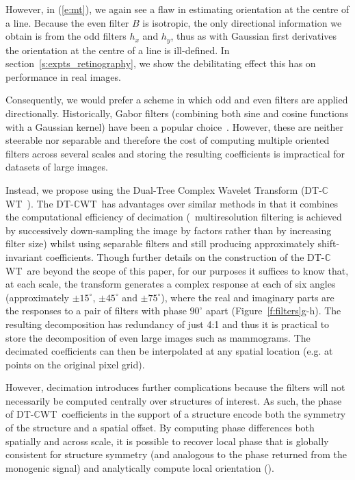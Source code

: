\documentclass[10pt,twocolumn,letterpaper]{article}
\newcommand{\fref}[1]{Figure~\ref{#1}}
\newcommand{\eref}[1]{(\ref{#1})}
\def\dtcwt{DT-$\mathbb{C}$WT}
\newcommand{\comment}[1]{}
\begin{document}
However, in \eref{e:mt}, we again see a flaw in estimating orientation at the centre of a line. Because the even filter $B$ is isotropic, the only directional information we obtain is from the odd filters $h_x$ and $h_y$, thus as with Gaussian first derivatives the orientation at the centre of a line is ill-defined. In section~\ref{s:expts_retinography}, we show the debilitating effect this has on performance in real images.

Consequently, we would prefer a scheme in which odd and even filters are applied directionally. Historically, Gabor filters (combining both sine and cosine functions with a Gaussian kernel) have been a popular choice~\cite{Daugman_TASSP88}. However, these are neither steerable nor separable and therefore the cost of computing multiple oriented filters across several scales and storing the resulting coefficients is impractical for datasets of large images.

\comment{We leave Gabor filters, not only because they are computationally intensive but also because of the extra free parameter (angular resolution) that will affect the accuracy of the estimated orientation}

Instead, we propose using the Dual-Tree Complex Wavelet Transform (\dtcwt~\cite{Kingsbury_PTRSLA99}). The \dtcwt~has advantages over similar methods in that it combines the computational efficiency of decimation (\ie~multiresolution filtering is achieved by successively down-sampling the image by factors rather than by increasing filter size) whilst using separable filters and still producing approximately shift-invariant coefficients. Though further details on the construction of the \dtcwt~are beyond the scope of this paper, for our purposes it suffices to know that, at each scale, the transform generates a complex response at each of six angles (approximately $\pm15^\circ$, $\pm45^\circ$ and $\pm75^\circ$), where the real and imaginary parts are the responses to a pair of filters with phase $90^\circ$ apart (\fref{f:filters}g-h). The resulting decomposition has redundancy of just 4:1 and thus it is practical to store the decomposition of even large images such as mammograms. The decimated coefficients can then be interpolated at any spatial location (e.g. at points on the original pixel grid).

However, decimation introduces further complications because the filters will not necessarily be computed centrally over structures of interest. As such, the phase of \dtcwt~coefficients in the support of a structure encode both the symmetry of the structure and a spatial offset. By computing phase differences both spatially and across scale, it is possible to recover local phase that is globally consistent for structure symmetry (and analogous to the phase returned from the monogenic signal) and analytically compute local orientation (\cite{Anderson_ICP05,Anderson_ILP05}).
\end{document}
